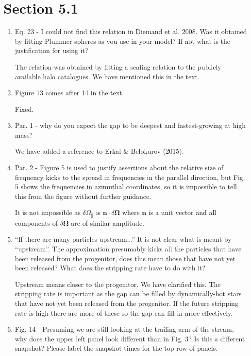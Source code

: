 \documentclass{article}
\begin{document}
\section{Section 5.1}
\begin{enumerate}
\item Eq. 23 - I could not find this relation in Diemand et al. 2008. Was it obtained by fitting
Plummer spheres as you use in your model? If not what is the justification for using it?

{\color{red} The relation was obtained by fitting a scaling relation to the publicly available halo catalogues. We have mentioned this in the text.}

\item Figure 13 comes after 14 in the text.

{\color{red} Fixed.}

\item Par. 1 - why do you expect the gap to be deepest and fastest-growing at high mass?

{\color{red} We have added a reference to Erkal \& Belokurov (2015).}

\item Par. 2 - Figure 5 is used to justify assertions about the relative size of frequency kicks to
the spread in frequencies in the parallel direction, but Fig. 5 shows the frequencies in
azimuthal coordinates, so it is impossible to tell this from the figure without further
guidance.

{\color{red} It is not impossible as $\delta\Omega_\parallel$ is $\boldsymbol{n}\cdot\delta\boldsymbol{\Omega}$ where $\boldsymbol{n}$ is a unit vector and all components of $\delta\boldsymbol{\Omega}$ are of similar amplitude.}

\item “If there are many particles upstream...” It is not clear what is meant by “upstream”. The
approximation presumably kicks all the particles that have been released from the
progenitor, does this mean those that have not yet been released? What does the
stripping rate have to do with it?

{\color{red} Upstream means closer to the progenitor. We have clarified this. The stripping rate is important as the gap can be filled by dynamically-hot stars that have not yet been released from the progenitor. If the future stripping rate is high there are more of these so the gap can fill in more effectively.}

\item Fig. 14 - Presuming we are still looking at the trailing arm of the stream, why does the
upper left panel look different than in Fig. 3? Is this a different snapshot? Please label
the snapshot times for the top row of panels.


\end{enumerate}
\end{document}
